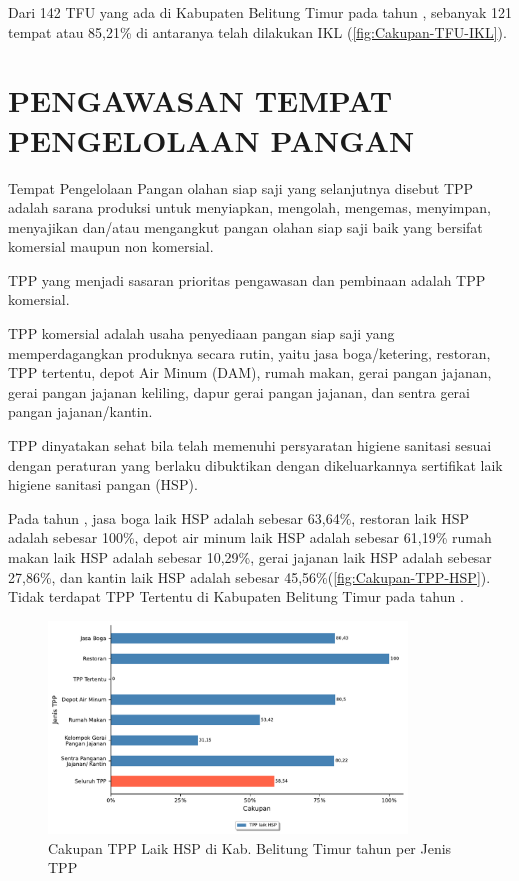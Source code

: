 Dari 142 TFU yang ada di Kabupaten Belitung Timur pada tahun \tP,
sebanyak 121 tempat atau 85,21\% di antaranya telah dilakukan IKL (\autoref{fig:Cakupan-TFU-IKL}).

\section{PENGAWASAN TEMPAT PENGELOLAAN PANGAN}
Tempat Pengelolaan Pangan olahan siap saji yang selanjutnya disebut TPP adalah sarana produksi untuk menyiapkan, mengolah, mengemas, menyimpan, menyajikan dan/atau mengangkut pangan olahan siap saji baik yang bersifat komersial maupun non komersial.

TPP yang menjadi sasaran prioritas pengawasan dan pembinaan adalah TPP komersial.

TPP komersial adalah usaha penyediaan pangan siap saji yang memperdagangkan produknya secara rutin, yaitu jasa boga/ketering, restoran, TPP tertentu, depot Air Minum (DAM), rumah makan, gerai pangan jajanan, gerai pangan jajanan keliling, dapur gerai pangan jajanan, dan sentra gerai pangan jajanan/kantin.

TPP dinyatakan sehat bila telah memenuhi persyaratan higiene sanitasi sesuai dengan peraturan yang berlaku dibuktikan dengan dikeluarkannya sertifikat laik higiene sanitasi pangan (HSP).

Pada tahun \tP{}, jasa boga laik HSP adalah sebesar 63,64\%, restoran laik HSP adalah sebesar 100\%, depot air minum laik HSP adalah sebesar 61,19\% rumah makan laik HSP adalah sebesar 10,29\%, gerai jajanan laik HSP adalah sebesar 27,86\%, dan kantin laik HSP adalah sebesar 45,56\%(\autoref{fig:Cakupan-TPP-HSP}). Tidak terdapat TPP Tertentu di Kabupaten Belitung Timur pada tahun \tP .

\begin{figure}[H]
    \centering
    \includegraphics[width=0.85\textwidth]{bab_07/bab_07_05_TPPHSP}
    \caption{Cakupan TPP Laik HSP di Kab. Belitung Timur tahun \tP per Jenis TPP}
    \label{fig:Cakupan-TPP-HSP}
\end{figure}